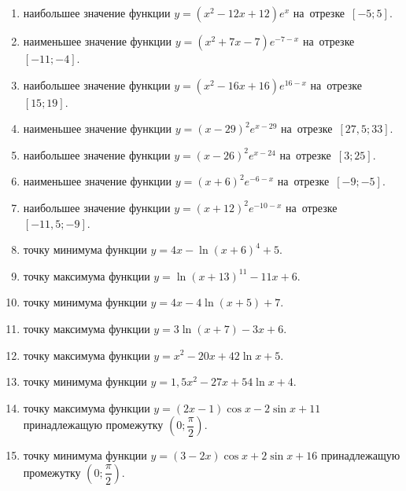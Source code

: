 \documentclass[a4paper,10pt]{article}
\begin{document}
\begin{enumerate}
\item {} наибольшее значение функции $y=\left(x^2 -12x +12\right)e^{x}$ на~отрезке~$\left[-5;5\right]$.

\item {} наименьшее значение функции $y=\left(x^2 +7x -7\right)e^{-7-x}$ на~отрезке~$\left[-11;-4\right]$.

\item {} наибольшее значение функции $y=\left(x^2 -16x +16\right)e^{16-x}$ на~отрезке~$\left[15;19\right]$.

\item {} наименьшее значение функции $y=\left(x-29\right)^2e^{x-29}$ на~отрезке~$\left[27,5;33\right]$.

\item {} наибольшее значение функции $y=\left(x-26\right)^2e^{x-24}$ на~отрезке~$\left[3;25\right]$.

\item {} наименьшее значение функции $y=\left(x+6\right)^2e^{-6-x}$ на~отрезке~$\left[-9;-5\right]$.

\item {} наибольшее значение функции $y=\left(x+12\right)^2e^{-10-x}$ на~отрезке~$\left[-11,5;-9\right]$.

\item {} точку минимума функции $y=4x-\ln\left(x+6\right)^{4}+5$.

\item {} точку максимума функции $y=\ln\left(x+13\right)^{11}-11x+6$.

\item {} точку минимума функции $y=4x-4\ln\left(x+5\right)+7$.

\item {} точку максимума функции $y=3\ln\left(x+7\right)-3x+6$.

\item {} точку максимума функции $y=x^2-20x+42\ln x +5$.

\item {} точку минимума функции $y=1,5x^2-27x+54\ln x +4$.

\item {} точку максимума функции $y=\left(2x-1\right)\cos x -2\sin x+11$
принадлежащую промежутку $\left(0;\dfrac{\pi}{2}\right)$.

\item {} точку минимума функции $y=\left(3-2x\right)\cos x +2\sin x+16$
принадлежащую промежутку $\left(0;\dfrac{\pi}{2}\right)$.


\end{enumerate}
\end{document}

